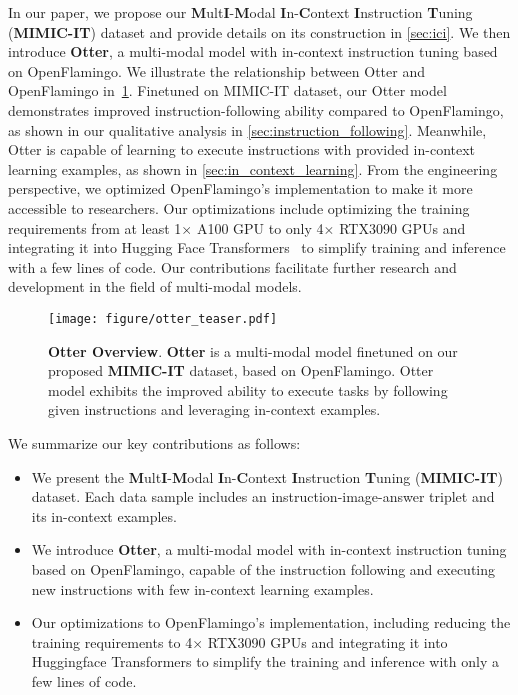 \documentclass{article}
\begin{document}
In our paper, we propose our \textbf{M}ult\textbf{I}-\textbf{M}odal \textbf{I}n-\textbf{C}ontext \textbf{I}nstruction \textbf{T}uning (\textbf{MIMIC-IT}) dataset and provide details on its construction in \cref{sec:ici}. We then introduce \textbf{Otter}, a multi-modal model with in-context instruction tuning based on OpenFlamingo. We illustrate the relationship between Otter and OpenFlamingo in~\cref{fig:otter_teaser}. Finetuned on MIMIC-IT dataset, our Otter model demonstrates improved instruction-following ability compared to OpenFlamingo, as shown in our qualitative analysis in \cref{sec:instruction_following}. Meanwhile, Otter is capable of learning to execute instructions with provided in-context learning examples, as shown in \cref{sec:in_context_learning}. From the engineering perspective, we optimized OpenFlamingo's implementation to make it more accessible to researchers. Our optimizations include optimizing the training requirements from at least 1$\times$ A100 GPU to only 4$\times$ RTX3090 GPUs and integrating it into Hugging Face Transformers~\cite{transformers} to simplify training and inference with a few lines of code. Our contributions facilitate further research and development in the field of multi-modal models.

\begin{figure}[tp]
    \centering
    \texttt{[image: figure/otter\_teaser.pdf]}
    \caption{\textbf{Otter Overview}. \textbf{Otter} is a multi-modal model finetuned on our proposed \textbf{MIMIC-IT} dataset, based on OpenFlamingo. Otter model exhibits the improved ability to execute tasks by following given instructions and leveraging in-context examples.}
    \label{fig:otter_teaser}
\end{figure}

We summarize our key contributions as follows:

\begin{itemize}
    \item We present the \textbf{M}ult\textbf{I}-\textbf{M}odal \textbf{I}n-\textbf{C}ontext \textbf{I}nstruction \textbf{T}uning (\textbf{MIMIC-IT}) dataset. Each data sample includes an instruction-image-answer triplet and its in-context examples.
    \item We introduce \textbf{Otter}, a multi-modal model with in-context instruction tuning based on OpenFlamingo, capable of the instruction following and executing new instructions with few in-context learning examples.
    \item Our optimizations to OpenFlamingo's implementation, including reducing the training requirements to 4$\times$ RTX3090 GPUs and integrating it into Huggingface Transformers to simplify the training and inference with only a few lines of code.
\end{itemize}
\end{document}

